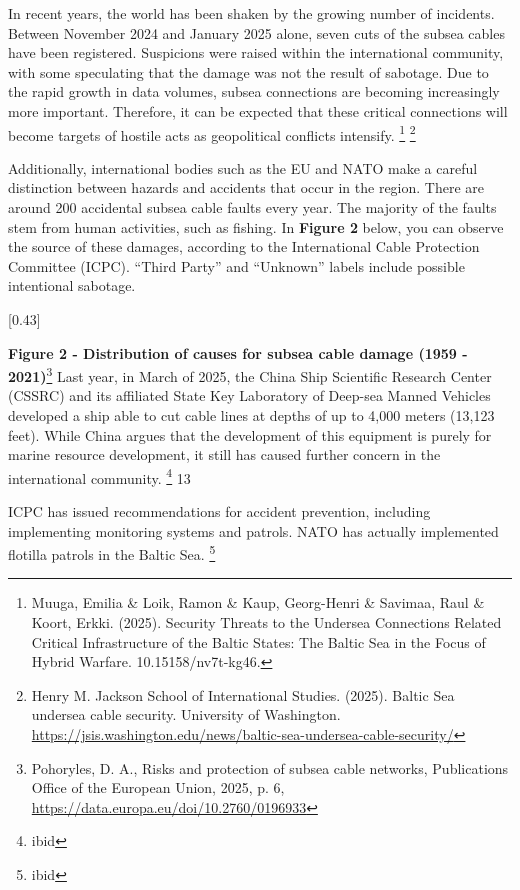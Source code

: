 In recent years, the world has been shaken by the growing number of incidents. Between November 2024 and January 2025 alone, seven cuts of the subsea cables have been registered. Suspicions were raised within the international community, with some speculating that the damage was not the result of sabotage. Due to the rapid growth in data volumes, subsea connections are becoming increasingly more important. Therefore, it can be expected that these critical connections will become targets of hostile acts as geopolitical conflicts intensify. \footnote{Muuga, Emilia \& Loik, Ramon \& Kaup, Georg-Henri \& Savimaa, Raul \& Koort, Erkki. (2025). Security Threats to the Undersea Connections Related Critical Infrastructure of the Baltic States: The Baltic Sea in the Focus of Hybrid Warfare. 10.15158/nv7t-kg46.} \footnote{Henry M. Jackson School of International Studies. (2025). Baltic Sea undersea cable security. University of Washington. \url{https://jsis.washington.edu/news/baltic-sea-undersea-cable-security/}}

Additionally, international bodies such as the EU and NATO make a careful distinction between hazards and accidents that occur in the region. There are around 200 accidental subsea cable faults every year. The majority of the faults stem from human activities, such as fishing. In \textbf{Figure 2} below, you can observe the source of these damages, according to the International Cable Protection Committee (ICPC). “Third Party” and “Unknown” labels include possible intentional sabotage.

[0.43]

\textbf{Figure 2 - Distribution of causes for subsea cable damage (1959 - 2021)}\footnote{Pohoryles, D. A., Risks and protection of subsea cable networks, Publications Office of the European Union, 2025, p. 6, \url{https://data.europa.eu/doi/10.2760/0196933}} Last year, in March of 2025, the China Ship Scientific Research Center (CSSRC) and its affiliated State Key Laboratory of Deep-sea Manned Vehicles developed a ship able to cut cable lines at depths of up to 4,000 meters (13,123 feet). While China argues that the development of this equipment is purely for marine resource development, it still has caused further concern in the international community. \footnote{ibid} 13

ICPC has issued recommendations for accident prevention, including implementing monitoring systems and patrols. NATO has actually implemented flotilla patrols in the Baltic Sea. \footnote{ibid}


